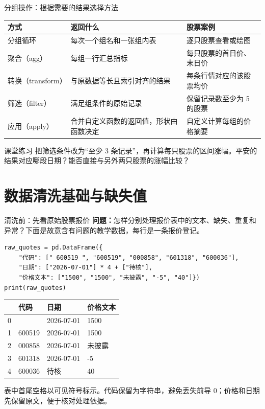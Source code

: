 \documentclass[9pt]{ctexbeamer}
\begin{document}
\begin{frame}{分组操作：根据需要的结果选择方法}
\small
\begin{center}
\begin{tabular}{p{}p{}p{}}
\toprule
方式 & 返回什么 & 股票案例 \\
\midrule
分组循环 & 每次一个组名和一张组内表 & 逐只股票查看或绘图 \\[6pt]
聚合（agg） & 每组一行汇总指标 & 每只股票的首日价、末日价 \\[6pt]
转换（transform） & 与原数据等长且索引对齐的结果 & 每条行情对应的该股票均价 \\[6pt]
筛选（filter） & 满足组条件的原始记录 & 保留记录数至少为 5 的股票 \\[6pt]
应用（apply） & 合并自定义函数的返回值，形状由函数决定 & 自定义计算每组的价格摘要 \\
\bottomrule
\end{tabular}
\end{center}
\begin{block}{课堂练习}
把筛选条件改为“至少 3 条记录”，再计算每只股票的区间涨幅。平安的结果对应哪段日期？能否直接与另外两只股票的涨幅比较？
\end{block}
\end{frame}

\section{数据清洗基础与缺失值}

\begin{frame}[fragile]{清洗前：先看原始股票报价}
\small \textbf{问题：}怎样分别处理报价表中的文本、缺失、重复和异常？下面是故意含有问题的教学数据，每行是一条报价登记。
\begin{lstlisting}[basicstyle=\ttfamily\scriptsize]
raw_quotes = pd.DataFrame({
    "代码": [" 600519 ", "600519", "000858", "601318", "600036"],
    "日期": ["2026-07-01"] * 4 + ["待核"],
    "价格文本": ["1500", "1500", "未披露", "-5", "40"]})
print(raw_quotes)
\end{lstlisting}
\begin{center}
\small
\begin{tabular}{rlll}
\toprule
 & 代码 & 日期 & 价格文本 \\
\midrule
0 & \texttt{\textvisiblespace600519\textvisiblespace} & 2026-07-01 & 1500 \\
1 & 600519 & 2026-07-01 & 1500 \\
2 & 000858 & 2026-07-01 & 未披露 \\
3 & 601318 & 2026-07-01 & -5 \\
4 & 600036 & 待核 & 40 \\
\bottomrule
\end{tabular}
\end{center}
\small 表中首尾空格以可见符号标示。代码保留为字符串，避免丢失前导 0；价格和日期先保留原文，便于核对处理依据。
\end{frame}
\end{document}
